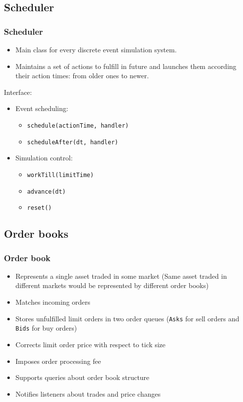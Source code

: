 \documentclass{beamer}
\begin{document}
\subsection{Scheduler}
\begin{frame}
\frametitle{Scheduler}
\begin{itemize}
  \item Main class for every discrete event simulation system.
  \item Maintains a set of actions to fulfill in future and launches them according their action times: from older ones to newer.
\end{itemize}
Interface:
\begin{itemize}
  \item Event scheduling:
  \begin{itemize}
    \item \texttt{schedule(actionTime, handler)}
    \item \texttt{scheduleAfter(dt, handler)}
  \end{itemize}
  \item Simulation control:
  \begin{itemize}
    \item \texttt{workTill(limitTime)}
    \item \texttt{advance(dt)}
    \item \texttt{reset()}
  \end{itemize}
\end{itemize}
\end{frame}

\subsection{Order books} %
\begin{frame}
\frametitle{Order book}
\begin{itemize}
  \item Represents a single asset traded in some market (Same asset traded in different markets would be represented by different order books)
  \item Matches incoming orders
  \item Stores unfulfilled limit orders in two order queues (\texttt{Asks} for sell orders and \texttt{Bids} for buy orders)
  \item Corrects limit order price with respect to tick size
  \item Imposes order processing fee
  \item Supports queries about order book structure
  \item Notifies listeners about trades and price changes
\end{itemize}
\end{frame}
\end{document}
